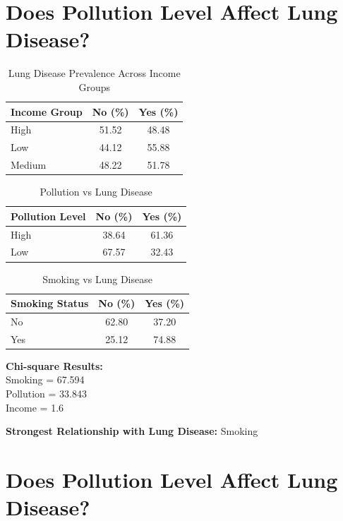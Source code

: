 \documentclass[12pt,a4paper]{report}
\begin{document}
\section*{Does Pollution Level Affect Lung Disease?}

\begin{table}[h!]
\centering
\caption{Lung Disease Prevalence Across Income Groups}
\begin{tabular}{lcc}
\hline
\textbf{Income Group} & \textbf{No (\%)} & \textbf{Yes (\%)} \\
\hline
High    & 51.52 & 48.48 \\
Low     & 44.12 & 55.88 \\
Medium  & 48.22 & 51.78 \\
\hline
\end{tabular}
\end{table}

\begin{table}[h!]
\centering
\caption{Pollution vs Lung Disease}
\begin{tabular}{lcc}
\hline
\textbf{Pollution Level} & \textbf{No (\%)} & \textbf{Yes (\%)} \\
\hline
High & 38.64 & 61.36 \\
Low  & 67.57 & 32.43 \\
\hline
\end{tabular}
\end{table}

\begin{table}[h!]
\centering
\caption{Smoking vs Lung Disease}
\begin{tabular}{lcc}
\hline
\textbf{Smoking Status} & \textbf{No (\%)} & \textbf{Yes (\%)} \\
\hline
No  & 62.80 & 37.20 \\
Yes & 25.12 & 74.88 \\
\hline
\end{tabular}
\end{table}

\noindent
\textbf{Chi-square Results:}\\
Smoking = 67.594 \\
Pollution = 33.843 \\
Income = 1.6 \


\textbf{Strongest Relationship with Lung Disease:} Smoking
\section*{Does Pollution Level Affect Lung Disease?}
\end{document}
